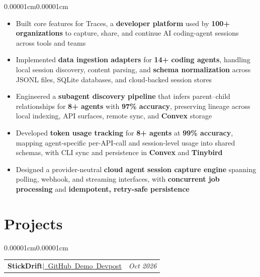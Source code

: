 \documentclass[10pt, letterpaper]{article}
\makeatletter
\newenvironment{highlights}{
    \begin{itemize}[
        topsep=0.10 cm,
        parsep=0.10 cm,
        partopsep=0pt,
        itemsep=0pt,
        leftmargin=10pt
    ]
}{
    \end{itemize}
}
\newenvironment{onecolentry}{
    \begin{adjustwidth}{0.00001cm}{0.00001cm}
}{
    \end{adjustwidth}
}
\newenvironment{twocolentry}[2][]{
    \onecolentry
    \def\secondColumn{#2}
    \begin{tabular*}{\linewidth}{@{}l@{\extracolsep{\fill}}r@{}}
}{
    & \secondColumn
    \end{tabular*}
    \endonecolentry
}
\makeatother
\begin{document}
\begin{onecolentry}
\begin{highlights}
\item Built core features for Traces, a \textbf{developer platform} used by \textbf{100+ organizations} to capture, share, and continue AI coding-agent sessions across tools and teams

\item Implemented \textbf{data ingestion adapters} for \textbf{14+ coding agents}, handling local session discovery, content parsing, and \textbf{schema normalization} across JSONL files, SQLite databases, and cloud-backed session stores

\item Engineered a \textbf{subagent discovery pipeline} that infers parent--child relationships for \textbf{8+ agents} with \textbf{97\% accuracy}, preserving lineage across local indexing, API surfaces, remote sync, and \textbf{Convex} storage

\item Developed \textbf{token usage tracking} for \textbf{8+ agents} at \textbf{99\% accuracy}, mapping agent-specific per-API-call and session-level usage into shared schemas, with CLI sync and persistence in \textbf{Convex} and \textbf{Tinybird}

\item Designed a provider-neutral \textbf{cloud agent session capture engine} spanning polling, webhook, and streaming interfaces, with \textbf{concurrent job processing} and \textbf{idempotent, retry-safe persistence}
\end{highlights}
\end{onecolentry}

\section{Projects}
\vspace{0.10 cm}


\begin{twocolentry}{\textit{Oct 2026}}
    \textbf{StickDrift}\hspace{0.20cm}$|$\hspace{0.20cm}\href{https://github.com/bryanlaiwei/StickDrift}{\faGithub~GitHub}\hspace{0.20cm}\href{https://www.youtube.com/watch?v=d01z2tL992U}{\faYoutube~Demo}\hspace{0.20cm}\href{https://devpost.com/software/stickdrift}{\faLink~Devpost}
\end{twocolentry}
\end{document}
